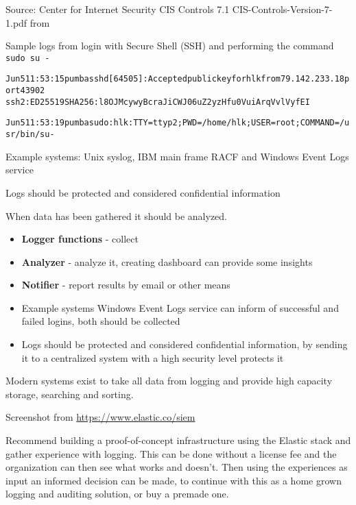 \documentclass[Screen16to9,17pt]{foils}
\begin{document}
Source:
Center for Internet Security CIS Controls 7.1 CIS-Controls-Version-7-1.pdf
from 





Sample logs from login with Secure Shell (SSH) and performing the command \verb+sudo su -+
\begin{alltt}
Jun  5 11:53:15 pumba sshd[64505]: Accepted publickey for hlk from 79.142.233.18 port 43902
 ssh2: ED25519 SHA256:l8OJMcywyBcraJiCWJ06uZ2yzHfu0VuiArqVvlVyfEI

Jun  5 11:53:19 pumba sudo:      hlk : TTY=ttyp2 ; PWD=/home/hlk ; USER=root ; COMMAND=/usr/bin/su -
\end{alltt}

\begin{list1}
\item Example systems: Unix syslog, IBM main frame RACF and Windows Event Logs service
\item Logs should be protected and considered confidential information
\end{list1}




When data has been gathered it should be analyzed.

\begin{itemize}
\item {\bf Logger functions} - collect
\item {\bf Analyzer} - analyze it, creating dashboard can provide some insights
\item {\bf Notifier} - report results by email or other means
\item Example systems Windows Event Logs service can inform of successful and failed logins, both should be collected
\item Logs should be protected and considered confidential information, by sending it to a centralized system with a high security level protects it
\end{itemize}

Modern systems exist to take all data from logging and provide high capacity storage, searching and sorting.


Screenshot from \url{https://www.elastic.co/siem}

Recommend building a proof-of-concept infrastructure using the Elastic stack and gather experience with logging. This can be done without a license fee and the organization can then see what works and doesn't. Then using the experiences as input an informed decision can be made, to continue with this as a home grown logging and auditing solution, or buy a premade one.
\end{document}
